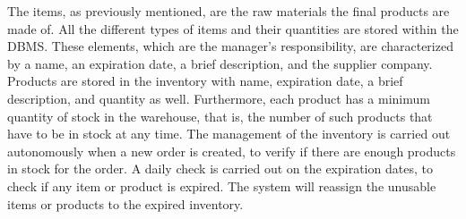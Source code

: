 The items, as previously mentioned, are the raw materials the final products are made of. All the different types of items and their quantities are stored within the DBMS. These elements, which are the manager's responsibility, are characterized by a name, an expiration date, a brief description, and the supplier company. Products are stored in the inventory with name, expiration date, a brief description, and quantity as well. Furthermore, each product has a minimum quantity of stock in the warehouse, that is, the number of such products that have to be in stock at any time. The management of the inventory is carried out autonomously when a new order is created, to verify if there are enough products in stock for the order. A daily check is carried out on the expiration dates, to check if any item or product is expired. The system will reassign the unusable items or products to the expired inventory.
%
%
%
%
